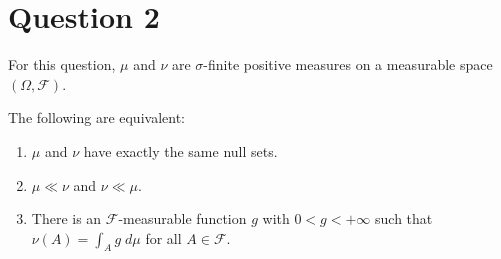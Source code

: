 \documentclass{unswmaths}
\begin{document}
\section*{Question 2}
For this question, $\mu$ and $\nu$ are $\sigma$-finite positive measures
on a measurable space $(\Omega,\mathcal{F})$.
\begin{theorem}
    The following are equivalent:
    \begin{enumerate}
        \item{} $\mu$ and $\nu$ have exactly the same null sets.
        \item{} $\mu \ll \nu$ and $\nu \ll \mu$.
        \item{} There is an $\mathcal{F}$-measurable
        function $g$ with $0 < g < +\infty$ such that $\nu(A) = \int_A g\;d\mu$
        for all $A \in \mathcal{F}$.
    \end{enumerate}
\end{theorem}
\end{document}
